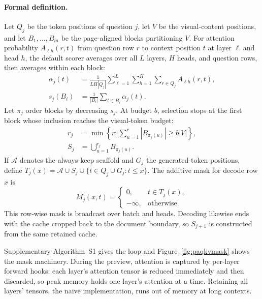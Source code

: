 \documentclass[letterpaper]{article} %
\begin{document}
\paragraph{Formal definition.}
Let $Q_j$ be the token positions of question $j$, let $V$ be the visual-content positions, and let $B_1,\ldots,B_m$ be the page-aligned blocks partitioning $V$. For attention probability $A_{\ell h}(r,t)$ from question row $r$ to context position $t$ at layer $\ell$ and head $h$, the default scorer averages over all $L$ layers, $H$ heads, and question rows, then averages within each block:
\begin{equation}
\begin{aligned}
\alpha_j(t)&=\frac{1}{LH|Q_j|}\sum_{\ell=1}^{L}\sum_{h=1}^{H}
                  \sum_{r\in Q_j}A_{\ell h}(r,t),\\
s_j(B_i)&=\frac{1}{|B_i|}\sum_{t\in B_i}\alpha_j(t).
\end{aligned}
\label{eq:block-score}
\end{equation}
Let $\pi_j$ order blocks by decreasing $s_j$. At budget $b$, selection stops at the first block whose inclusion reaches the visual-token budget:
\begin{equation}
\begin{aligned}
r_j&=\min\left\{r:\sum_{u=1}^{r}|B_{\pi_j(u)}|\geq b|V|\right\},\\
S_j&=\bigcup_{u=1}^{r_j}B_{\pi_j(u)}.
\end{aligned}
\label{eq:block-select}
\end{equation}
If $\mathcal{A}$ denotes the always-keep scaffold and $G_j$ the
generated-token positions, define
$T_j(x)=\mathcal{A}\cup S_j\cup\{t\in Q_j\cup G_j:t\leq x\}$. The additive
mask for decode row $x$ is
\begin{equation}
M_j(x,t)=
\begin{cases}
0, & t\in T_j(x),\\
-\infty, & \text{otherwise}.
\end{cases}
\label{eq:restricted-mask}
\end{equation}
This row-wise mask is broadcast over batch and heads. Decoding likewise ends
with the cache cropped back to the document boundary, so $S_{j+1}$ is
constructed from the same retained cache.

Supplementary Algorithm~S1 gives the loop
and Figure~\ref{fig:paqkvmask} shows the mask machinery. During the preview,
attention is captured by per-layer forward hooks: each layer's attention
tensor is reduced immediately and then discarded, so peak memory holds one
layer's attention at a time. Retaining all layers' tensors, the naive
implementation, runs out of memory at long contexts.
\end{document}
